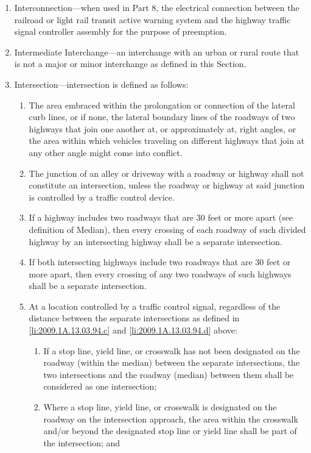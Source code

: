\documentclass[9pt]{memoir}
\begin{document}
{\begin{enumerate}[label=\arabic*., ref=\arabic*]
\item Interconnection---when used in Part 8, the electrical connection between the railroad or light rail transit active warning system and the highway traffic signal controller assembly for the purpose of preemption.
\item Intermediate Interchange---an interchange with an urban or rural route that is not a major or minor interchange as defined in this Section.
\item Intersection---intersection is defined as follows:
\begin{enumerate}[label=\alph*., ref=(\alph*)]
\item The area embraced within the prolongation or connection of the lateral curb lines, or if none, the lateral boundary lines of the roadways of two highways that join one another at, or approximately at, right angles, or the area within which vehicles traveling on different highways that join at any other angle might come into conflict.
\item The junction of an alley or driveway with a roadway or highway shall not constitute an intersection, unless the roadway or highway at said junction is controlled by a traffic control device.
\item \label{li:2009.1A.13.03.94.c}If a highway includes two roadways that are 30 feet or more apart (see definition of Median), then every crossing of each roadway of such divided highway by an intersecting highway shall be a separate intersection.
\item \label{li:2009.1A.13.03.94.d}If both intersecting highways include two roadways that are 30 feet or more apart, then every crossing of any two roadways of such highways shall be a separate intersection.
\item At a location controlled by a traffic control signal, regardless of the distance between the separate intersections as defined in \ref{li:2009.1A.13.03.94.c} and \ref{li:2009.1A.13.03.94.d} above:
\begin{enumerate}[label=\arabic*., ref=\arabic*]
\item If a stop line, yield line, or crosswalk has not been designated on the roadway (within the median) between the separate intersections, the two intersections and the roadway (median) between them shall be considered as one intersection;
\item Where a stop line, yield line, or crosswalk is designated on the roadway on the intersection approach, the area within the crosswalk and/or beyond the designated stop line or yield line shall be part of the intersection; and

\end{enumerate}
\end{enumerate}
\end{enumerate}}
\end{document}
